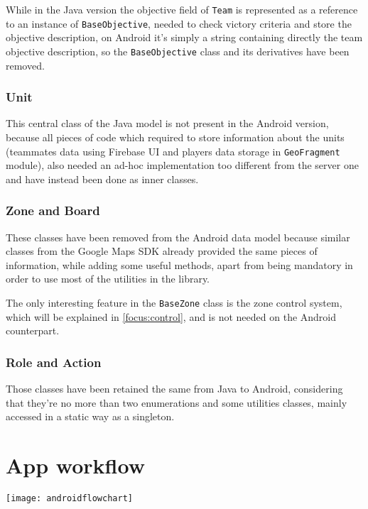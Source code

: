 				While in the Java version the objective field of \lstinline|Team| is represented as a reference to an instance of \lstinline|BaseObjective|, needed to check victory criteria and store the objective description, on Android it's simply a string containing directly the team objective description, so the \lstinline|BaseObjective| class and its derivatives have been removed.
			
			\subsubsection{Unit}
			
				This central class of the Java model is not present in the Android version, because all pieces of code which required to store information about the units (teammates data using Firebase UI and players data storage in \lstinline|GeoFragment| module), also needed an ad-hoc implementation too different from the server one and have instead been done as inner classes.
			
			\subsubsection{Zone and Board}
			
				These classes have been removed from the Android data model because similar classes from the Google Maps SDK already provided the same pieces of information, while adding some useful methods, apart from being mandatory in order to use most of the utilities in the library.
				
				The only interesting feature in the \lstinline|BaseZone| class is the zone control system, which will be explained in \autoref{focus:control}, and is not needed on the Android counterpart.
			
			\subsubsection{Role and Action}
			
				Those classes have been retained the same from Java to Android, considering that they're no more than two enumerations and some utilities classes, mainly accessed in a static way as a singleton.
			
	\section{App workflow}\label{app:workflow}
	
		\texttt{[image: androidflowchart]}
		
